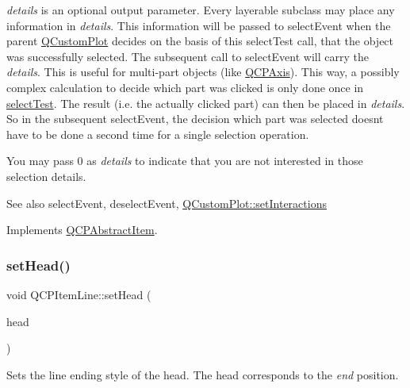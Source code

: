 {\itshape details} is an optional output parameter. Every layerable subclass may place any information in {\itshape details}. This information will be passed to select\+Event when the parent \mbox{\hyperlink{class_q_custom_plot}{Q\+Custom\+Plot}} decides on the basis of this select\+Test call, that the object was successfully selected. The subsequent call to select\+Event will carry the {\itshape details}. This is useful for multi-\/part objects (like \mbox{\hyperlink{class_q_c_p_axis}{Q\+C\+P\+Axis}}). This way, a possibly complex calculation to decide which part was clicked is only done once in \mbox{\hyperlink{class_q_c_p_item_line_ae6cc5183f568e5fa9d7827abe4d405b5}{select\+Test}}. The result (i.\+e. the actually clicked part) can then be placed in {\itshape details}. So in the subsequent select\+Event, the decision which part was selected doesn\textquotesingle{}t have to be done a second time for a single selection operation.

You may pass 0 as {\itshape details} to indicate that you are not interested in those selection details.

\begin{DoxySeeAlso}{See also}
select\+Event, deselect\+Event, \mbox{\hyperlink{class_q_custom_plot_a5ee1e2f6ae27419deca53e75907c27e5}{Q\+Custom\+Plot\+::set\+Interactions}} 
\end{DoxySeeAlso}


Implements \mbox{\hyperlink{class_q_c_p_abstract_item_a96d522d10ffc0413b9a366c6f7f0476b}{Q\+C\+P\+Abstract\+Item}}.

\mbox{\label{class_q_c_p_item_line_aebf3d687114d584e0459db6759e2c3c3}} 
\subsubsection{\texorpdfstring{set\+Head()}{setHead()}}
{\footnotesize\ttfamily void Q\+C\+P\+Item\+Line\+::set\+Head (\begin{DoxyParamCaption}\item[{const \mbox{\hyperlink{class_q_c_p_line_ending}{Q\+C\+P\+Line\+Ending}} \&}]{head }\end{DoxyParamCaption})}

Sets the line ending style of the head. The head corresponds to the {\itshape end} position.

